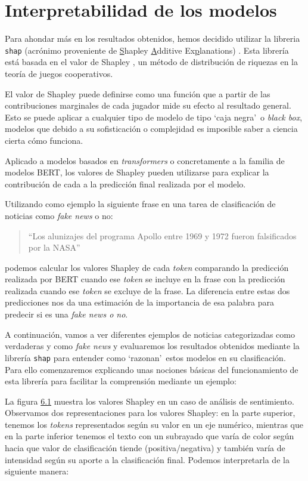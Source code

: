 \section{Interpretabilidad de los modelos}
\label{sec:shap}
Para ahondar más en los resultados obtenidos, hemos decidido utilizar la libreria \texttt{shap} (acrónimo proveniente de {\ul Sh}apley {\ul A}dditive Ex{\ul p}lanations) \citep{SHAP}. Esta librería está basada en el valor de Shapley \citep{Shapley1952}, un método de distribución de riquezas en la teoría de juegos cooperativos. 

El valor de Shapley puede definirse como una función que a partir de las contribuciones marginales de cada jugador mide su efecto al resultado general. Esto se puede aplicar a cualquier tipo de modelo de tipo `caja negra'\ o \textit{black box}, modelos que debido a su sofisticación o complejidad es imposible saber a ciencia cierta cómo funciona. 

Aplicado a modelos basados en \textit{transformers} o concretamente a la familia de modelos BERT, los valores de Shapley pueden utilizarse para explicar la contribución de cada  a la predicción final realizada por el modelo. 

Utilizando como ejemplo la siguiente frase en una tarea de clasificación de noticias como \textit{fake news} o no:
\begin{quotation}
    ``Los alunizajes del programa Apollo entre 1969 y 1972 fueron falsificados por la NASA''
\end{quotation}

podemos calcular los valores Shapley de cada \textit{token} comparando la predicción realizada por BERT cuando ese \textit{token} se incluye en la frase con la predicción realizada cuando ese \textit{token} se excluye de la frase. La diferencia entre estas dos predicciones nos da una estimación de la importancia de esa palabra para predecir si es una \textit{fake news o no}.

A continuación, vamos a ver diferentes ejemplos de noticias categorizadas como verdaderas y como \textit{fake news} y evaluaremos los resultados obtenidos mediante la librería \texttt{shap} para entender como `razonan'\ estos modelos en su clasificación. Para ello comenzaremos explicando unas nociones básicas del funcionamiento de esta librería para facilitar la comprensión mediante un ejemplo:

La figura \hyperref[fig:shap-ex]{6.1} muestra los valores Shapley en un caso de análisis de sentimiento. Observamos dos representaciones para los valores Shapley: en la parte superior, tenemos los \textit{tokens} representados según su valor en un eje numérico, mientras que en la parte inferior tenemos el texto con un subrayado que varía de color según hacia que valor de clasificación tiende (positiva/negativa) y también varía de intensidad según su aporte a la clasificación final. Podemos interpretarla de la siguiente manera: 

